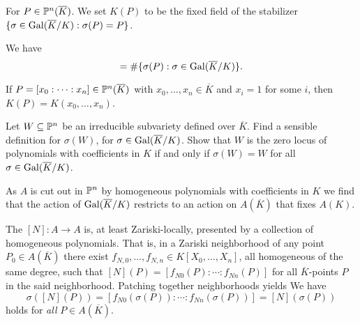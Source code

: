 \begin{definition}
  For $P\in {\mathbb{P}}^n(\overline K)$. 
  We set $K(P)$ to be the fixed field of the stabilizer
  $\{\sigma\in \mathrm{Gal}(\overline{K}/K) : \sigma(P)=P\}$. 
\end{definition}

We have
\begin{equation*}
  [K(P):K]  = \#\{\sigma(P) : \sigma\in\absgalk \}. 
\end{equation*}

If $P=[x_0:\cdots:x_n] \in {\mathbb{P}}^n(\overline K)$ with
$x_0,\ldots,x_n\in\overline K$ and $x_i=1$ for some
$i$, then $K(P) = K(x_0,\ldots,x_n)$. 

\begin{exercise}
  Let $W\subseteq{\mathbb{P}}^n$ be an irreducible subvariety defined
  over $\overline K$. Find a sensible definition for $\sigma(W)$,
  for $\sigma\in \mathrm{Gal}(\overline{K}/K)$.  Show that $W$ is the zero locus of
  polynomials with coefficients in $K$ if and only if $\sigma(W)=W$
  for all $\sigma\in \mathrm{Gal}(\overline{K}/K)$.
\end{exercise}


As $A$ is cut out in ${\mathbb{P}}^n$ by homogeneous polynomials with
coefficients in $K$ we find that the action of $\mathrm{Gal}(\overline{K}/K)$ restricts to
an action on
$A(\overline K)$ that fixes $A(K)$.

The $[N]\colon A\rightarrow A$ is, at least Zariski-locally, presented
by a collection of homogeneous polynomials. That is, in a Zariski
neighborhood of any point $P_0\in A(\overline K)$ there exist
$f_{N,0},\ldots,f_{N,n}\in K[X_0,\ldots,X_n]$, all homogeneous of the
same degree, such that 
$[N](P) = [f_{N0}(P):\cdots:f_{Nn}(P)]$ for all $\overline K$-points  $P$ in the said
neighborhood.
Patching together neighborhoods yields
We have
$$\sigma([N](P)) = [f_{N0}(\sigma(P)):\cdots:f_{Nn}(\sigma(P))] =
[N](\sigma(P))$$
holds for \textit{all} $P\in A(\overline K)$.


